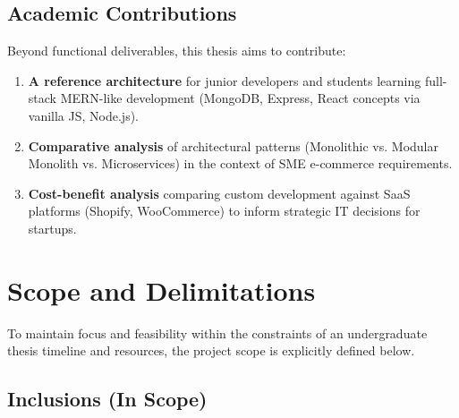 \documentclass[12pt, a4paper]{report}
\begin{document}
\subsection{Academic Contributions}

Beyond functional deliverables, this thesis aims to contribute:

\begin{enumerate}
    \item \textbf{A reference architecture} for junior developers and students learning full-stack MERN-like development (MongoDB, Express, React concepts via vanilla JS, Node.js).
    
    \item \textbf{Comparative analysis} of architectural patterns (Monolithic vs. Modular Monolith vs. Microservices) in the context of SME e-commerce requirements.
    
    \item \textbf{Cost-benefit analysis} comparing custom development against SaaS platforms (Shopify, WooCommerce) to inform strategic IT decisions for startups.
\end{enumerate}

\section{Scope and Delimitations}

To maintain focus and feasibility within the constraints of an undergraduate thesis timeline and resources, the project scope is explicitly defined below.

\subsection{Inclusions (In Scope)}
\end{document}
